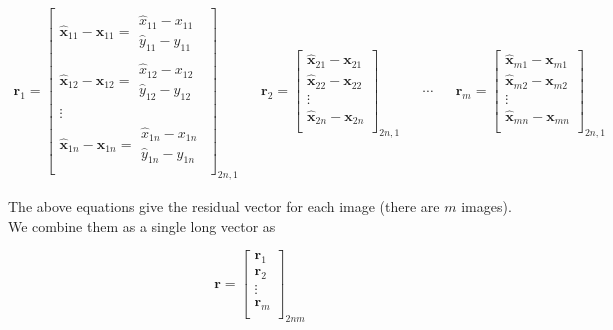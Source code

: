 \begin{align}
    \mathbf{r}_1 = \begin{bmatrix}
        \mathbf{\hat{x}}_{11} - \mathbf{x}_{11} = \begin{matrix}
        \hat{x}_{11} - x_{11} \\
        \hat{y}_{11} - y_{11}
        \end{matrix} \\
        \mathbf{\hat{x}}_{12} - \mathbf{x}_{12} = \begin{matrix}
        \hat{x}_{12} - x_{12} \\
        \hat{y}_{12} - y_{12}
        \end{matrix} \\
        \vdots \\
        \mathbf{\hat{x}}_{1n} - \mathbf{x}_{1n} = \begin{matrix}
        \hat{x}_{1n} - x_{1n} \\
        \hat{y}_{1n} - y_{1n}
        \end{matrix} \\
        \end{bmatrix}_{2n, 1}
    &&
    \mathbf{r}_2 = \begin{bmatrix}
        \mathbf{\hat{x}}_{21} - \mathbf{x}_{21} \\
        \mathbf{\hat{x}}_{22} - \mathbf{x}_{22} \\
        \vdots \\
        \mathbf{\hat{x}}_{2n} - \mathbf{x}_{2n} \\
        \end{bmatrix}_{2n, 1}
    && \cdots &&
    \mathbf{r}_m = \begin{bmatrix}
        \mathbf{\hat{x}}_{m1} - \mathbf{x}_{m1} \\
        \mathbf{\hat{x}}_{m2} - \mathbf{x}_{m2} \\
        \vdots \\
        \mathbf{\hat{x}}_{mn} - \mathbf{x}_{mn} \\
        \end{bmatrix}_{2n, 1}
    \nonumber    
\end{align}

The above equations give the residual vector for each image (there are $m$ images). We combine them as a single long vector as

\begin{equation}
    \mathbf{r} = \begin{bmatrix}
        \mathbf{r}_1 \\ \mathbf{r}_2 \\ \vdots \\ \mathbf{r}_m \\
        \end{bmatrix}_{2nm}
    \label{eq:q4b-ba-residual}
\end{equation}

